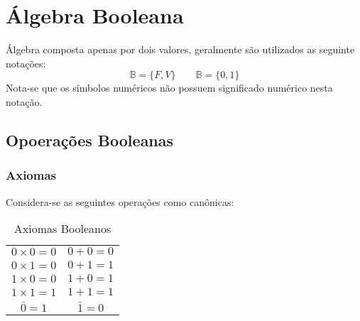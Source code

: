 \documentclass{article}
\begin{document}
    \section{Álgebra Booleana}
        \begin{definition}
            Álgebra composta apenas por dois valores, geralmente são utilizados as seguinte notações:
                \begin{equation}
                    \boxed{\mathbb{B} = \{F, V\}}
                    \qquad
                    \boxed{\mathbb{B} = \{0, 1\}}
                \end{equation}
            Nota-se que os símbolos numéricos não possuem significado numérico nesta notação.
        \end{definition}

        \subsection{Opoerações Booleanas}
            \subsubsection{Axiomas}
            \begin{definition}
                Considera-se as seguintes operações como canônicas:
                    \begin{table}[H]
                        \centering  
                        \begin{tabular}[]{cc}\hline
                            $0\times0=0$ & $0+0=0$\\
                            $0\times1=0$ & $0+1=1$\\
                            $1\times0=0$ & $1+0=1$\\
                            $1\times1=1$ & $1+1=1$\\\hline
                            $\bar{0} =1$ & $\bar{1}=0$\\\hline
                        \end{tabular}
                        \caption{Axiomas Booleanos}
                    \end{table}
            \end{definition}
\end{document}
